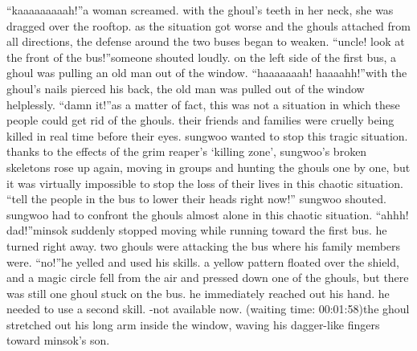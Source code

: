 “kaaaaaaaaah!”a woman screamed.
 with the ghoul’s teeth in her neck, she was dragged over the rooftop.
as the situation got worse and the ghouls attached from all directions, the defense around the two buses began to weaken.
“uncle! look at the front of the bus!”someone shouted loudly.
 on the left side of the first bus, a ghoul was pulling an old man out of the window.
“haaaaaaah! haaaahh!”with the ghoul’s nails pierced his back, the old man was pulled out of the window helplessly.
“damn it!”as a matter of fact, this was not a situation in which these people could get rid of the ghouls.
 their friends and families were cruelly being killed in real time before their eyes.
sungwoo wanted to stop this tragic situation.
thanks to the effects of the grim reaper’s ‘killing zone’, sungwoo’s broken skeletons rose up again, moving in groups and hunting the ghouls one by one, but it was virtually impossible to stop the loss of their lives in this chaotic situation.
“tell the people in the bus to lower their heads right now!” sungwoo shouted.
sungwoo had to confront the ghouls almost alone in this chaotic situation.
“ahhh! dad!”minsok suddenly stopped moving while running toward the first bus.
he turned right away.
two ghouls were attacking the bus where his family members were.
“no!”he yelled and used his skills.
 a yellow pattern floated over the shield, and a magic circle fell from the air and pressed down one of the ghouls, but there was still one ghoul stuck on the bus.
he immediately reached out his hand.
 he needed to use a second skill.
-not available now.
 (waiting time: 00:01:58)the ghoul stretched out his long arm inside the window, waving his dagger-like fingers toward minsok’s son.

